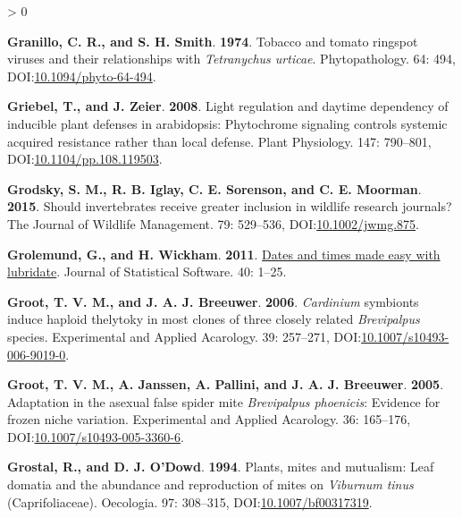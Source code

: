 \documentclass{ufdissertation}[overrideChapters] %
\newlength{\cslhangindent}
\newenvironment{CSLReferences}[2] %
 {%
  \setlength{\parindent}{0pt}
  \ifodd #1 \everypar{\setlength{\hangindent}{\cslhangindent}}\ignorespaces\fi
  \ifnum #2 > 0
  \setlength{\parskip}{#2\baselineskip}
  \fi
 }%
 {}
\begin{document}
{\begin{CSLReferences}{1}{1}
\leavevmode{}%
\textbf{Granillo, C. R., and S. H. Smith}. \textbf{1974}. Tobacco and tomato ringspot viruses and their relationships with {\emph{Tetranychus urticae}}. Phytopathology. 64: 494, DOI:\href{https://doi.org/10.1094/phyto-64-494}{10.1094/phyto-64-494}.

\leavevmode{}%
\textbf{Griebel, T., and J. Zeier}. \textbf{2008}. Light regulation and daytime dependency of inducible plant defenses in arabidopsis: Phytochrome signaling controls systemic acquired resistance rather than local defense. Plant Physiology. 147: 790--801, DOI:\href{https://doi.org/10.1104/pp.108.119503}{10.1104/pp.108.119503}.

\leavevmode{}%
\textbf{Grodsky, S. M., R. B. Iglay, C. E. Sorenson, and C. E. Moorman}. \textbf{2015}. Should invertebrates receive greater inclusion in wildlife research journals? The Journal of Wildlife Management. 79: 529--536, DOI:\href{https://doi.org/10.1002/jwmg.875}{10.1002/jwmg.875}.

\leavevmode{}%
\textbf{Grolemund, G., and H. Wickham}. \textbf{2011}. \href{https://www.jstatsoft.org/v40/i03/}{Dates and times made easy with {lubridate}}. Journal of Statistical Software. 40: 1--25.

\leavevmode{}%
\textbf{Groot, T. V. M., and J. A. J. Breeuwer}. \textbf{2006}. \emph{Cardinium} symbionts induce haploid thelytoky in most clones of three closely related {\emph{Brevipalpus}} species. Experimental and Applied Acarology. 39: 257--271, DOI:\href{https://doi.org/10.1007/s10493-006-9019-0}{10.1007/s10493-006-9019-0}.

\leavevmode{}%
\textbf{Groot, T. V. M., A. Janssen, A. Pallini, and J. A. J. Breeuwer}. \textbf{2005}. Adaptation in the asexual false spider mite {\emph{Brevipalpus phoenicis}}: Evidence for frozen niche variation. Experimental and Applied Acarology. 36: 165--176, DOI:\href{https://doi.org/10.1007/s10493-005-3360-6}{10.1007/s10493-005-3360-6}.

\leavevmode{}%
\textbf{Grostal, R., and D. J. O'Dowd}. \textbf{1994}. Plants, mites and mutualism: Leaf domatia and the abundance and reproduction of mites on {\emph{Viburnum tinus}} ({Caprifoliaceae}). Oecologia. 97: 308--315, DOI:\href{https://doi.org/10.1007/bf00317319}{10.1007/bf00317319}.


\end{CSLReferences}}
\end{document}
